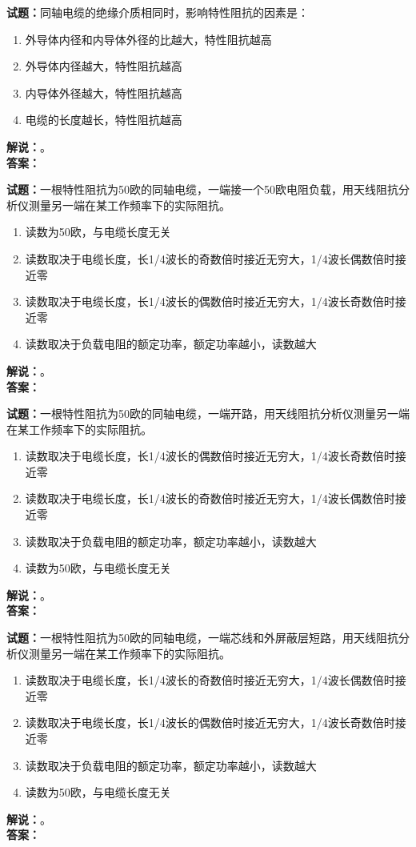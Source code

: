 \documentclass{ctexbook}
\begin{document}
\bigskip

\noindent\textbf{试题：}同轴电缆的绝缘介质相同时，影响特性阻抗的因素是：
\begin{enumerate}[leftmargin=3em]
  \item 外导体内径和内导体外径的比越大，特性阻抗越高
  \item 外导体内径越大，特性阻抗越高
  \item 内导体外径越大，特性阻抗越高
  \item 电缆的长度越长，特性阻抗越高
\end{enumerate}
\noindent\textbf{解说：}\textbf{}。\\\noindent\textbf{答案：}

\bigskip

\noindent\textbf{试题：}一根特性阻抗为50欧的同轴电缆，一端接一个50欧电阻负载，用天线阻抗分析仪测量另一端在某工作频率下的实际阻抗。
\begin{enumerate}[leftmargin=3em]
  \item 读数为50欧，与电缆长度无关
  \item 读数取决于电缆长度，长1/4波长的奇数倍时接近无穷大，1/4波长偶数倍时接近零
  \item 读数取决于电缆长度，长1/4波长的偶数倍时接近无穷大，1/4波长奇数倍时接近零
  \item 读数取决于负载电阻的额定功率，额定功率越小，读数越大
\end{enumerate}
\noindent\textbf{解说：}\textbf{}。\\\noindent\textbf{答案：}

\bigskip

\noindent\textbf{试题：}一根特性阻抗为50欧的同轴电缆，一端开路，用天线阻抗分析仪测量另一端在某工作频率下的实际阻抗。
\begin{enumerate}[leftmargin=3em]
  \item 读数取决于电缆长度，长1/4波长的偶数倍时接近无穷大，1/4波长奇数倍时接近零
  \item 读数取决于电缆长度，长1/4波长的奇数倍时接近无穷大，1/4波长偶数倍时接近零
  \item 读数取决于负载电阻的额定功率，额定功率越小，读数越大
  \item 读数为50欧，与电缆长度无关
\end{enumerate}
\noindent\textbf{解说：}\textbf{}。\\\noindent\textbf{答案：}

\bigskip

\noindent\textbf{试题：}一根特性阻抗为50欧的同轴电缆，一端芯线和外屏蔽层短路，用天线阻抗分析仪测量另一端在某工作频率下的实际阻抗。
\begin{enumerate}[leftmargin=3em]
  \item 读数取决于电缆长度，长1/4波长的奇数倍时接近无穷大，1/4波长偶数倍时接近零
  \item 读数取决于电缆长度，长1/4波长的偶数倍时接近无穷大，1/4波长奇数倍时接近零
  \item 读数取决于负载电阻的额定功率，额定功率越小，读数越大
  \item 读数为50欧，与电缆长度无关
\end{enumerate}
\noindent\textbf{解说：}\textbf{}。\\\noindent\textbf{答案：}
\end{document}
